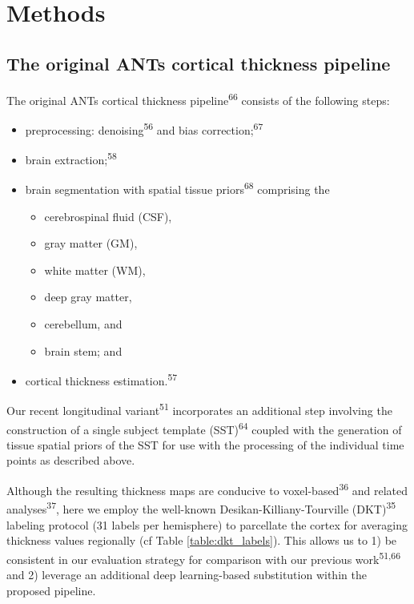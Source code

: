 \documentclass[
  12pt,
]{article}
\providecommand{\tightlist}{%
  \setlength{\itemsep}{0pt}\setlength{\parskip}{0pt}}
\begin{document}
\hypertarget{methods}{%
\section*{Methods}\label{methods}}

\hypertarget{the-original-ants-cortical-thickness-pipeline}{%
\subsection*{The original ANTs cortical thickness
pipeline}\label{the-original-ants-cortical-thickness-pipeline}}

The original ANTs cortical thickness pipeline\textsuperscript{66}
consists of the following steps:

\begin{itemize}
\tightlist
\item
  preprocessing: denoising\textsuperscript{56} and bias
  correction;\textsuperscript{67}
\item
  brain extraction;\textsuperscript{58}
\item
  brain segmentation with spatial tissue priors\textsuperscript{68}
  comprising the

  \begin{itemize}
  \tightlist
  \item
    cerebrospinal fluid (CSF),
  \item
    gray matter (GM),
  \item
    white matter (WM),
  \item
    deep gray matter,
  \item
    cerebellum, and
  \item
    brain stem; and
  \end{itemize}
\item
  cortical thickness estimation.\textsuperscript{57}
\end{itemize}

Our recent longitudinal variant\textsuperscript{51} incorporates an
additional step involving the construction of a single subject template
(SST)\textsuperscript{64} coupled with the generation of tissue spatial
priors of the SST for use with the processing of the individual time
points as described above.

Although the resulting thickness maps are conducive to
voxel-based\textsuperscript{36} and related
analyses\textsuperscript{37}, here we employ the well-known
Desikan-Killiany-Tourville (DKT)\textsuperscript{35} labeling protocol
(31 labels per hemisphere) to parcellate the cortex for averaging
thickness values regionally (cf Table \ref{table:dkt_labels}). This
allows us to 1) be consistent in our evaluation strategy for comparison
with our previous work\textsuperscript{51,66} and 2) leverage an
additional deep learning-based substitution within the proposed
pipeline.
\end{document}
